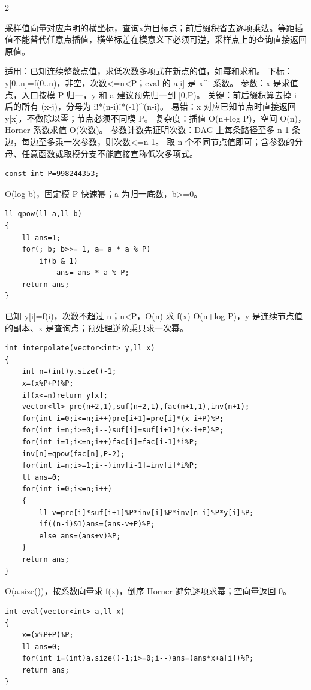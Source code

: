 \documentclass[UTF8,fontset=fandol,a4paper,twoside]{ctexart}
\newcommand{\note}[1]{{\fontsize{10}{12}\selectfont #1\par}}
\begin{document}
\begin{multicols}{2}
\note{采样值向量对应声明的横坐标，查询x为目标点；前后缀积省去逐项乘法。等距插值不能替代任意点插值，横坐标差在模意义下必须可逆，采样点上的查询直接返回原值。}
\note{适用：已知连续整数点值，求低次数多项式在新点的值，如幂和求和。 下标：y[\allowbreak{}0.\allowbreak{}.\allowbreak{}n]\allowbreak{}=\allowbreak{}f(\allowbreak{}0.\allowbreak{}.\allowbreak{}n)\allowbreak{}，非空，次数<\allowbreak{}=\allowbreak{}n<\allowbreak{}P；eval 的 a[\allowbreak{}i]\allowbreak{} 是 x\textasciicircum{}i 系数。 参数：x 是求值点，入口按模 P 归一，y 和 a 建议预先归一到 [\allowbreak{}0,\allowbreak{}P)\allowbreak{}。 关键：前后缀积算去掉 i 后的所有 (\allowbreak{}x-\allowbreak{}j)\allowbreak{}，分母为 i!*(\allowbreak{}n-\allowbreak{}i)\allowbreak{}!*(\allowbreak{}-\allowbreak{}1)\allowbreak{}\textasciicircum{}(\allowbreak{}n-\allowbreak{}i)\allowbreak{}。 易错：x 对应已知节点时直接返回 y[\allowbreak{}x]\allowbreak{}，不做除以零；节点必须不同模 P。 复杂度：插值 O(\allowbreak{}n+\allowbreak{}log P)\allowbreak{}，空间 O(\allowbreak{}n)\allowbreak{}，Horner 系数求值 O(\allowbreak{}次数)\allowbreak{}。 参数计数先证明次数：DAG 上每条路径至多 n-\allowbreak{}1 条边，每边至多乘一次参数，则次数<\allowbreak{}=\allowbreak{}n-\allowbreak{}1。 取 n 个不同节点值即可；含参数的分母、任意函数或取模分支不能直接宣称低次多项式。}
\begin{lstlisting}
const int P=998244353;
\end{lstlisting}
\note{O(\allowbreak{}log b)\allowbreak{}，固定模 P 快速幂；a 为归一底数，b>\allowbreak{}=\allowbreak{}0。}
\begin{lstlisting}
ll qpow(ll a,ll b)
{
    ll ans=1;
    for(; b; b>>= 1, a= a * a % P)
        if(b & 1)
            ans= ans * a % P;
    return ans;
}
\end{lstlisting}
\note{已知 y[\allowbreak{}i]\allowbreak{}=\allowbreak{}f(\allowbreak{}i)\allowbreak{}，次数不超过 n；n<\allowbreak{}P，O(\allowbreak{}n)\allowbreak{} 求 f(\allowbreak{}x)\allowbreak{} O(\allowbreak{}n+\allowbreak{}log P)\allowbreak{}，y 是连续节点值的副本、x 是查询点；预处理逆阶乘只求一次幂。}
\begin{lstlisting}
int interpolate(vector<int> y,ll x)
{
    int n=(int)y.size()-1;
    x=(x%P+P)%P;
    if(x<=n)return y[x];
    vector<ll> pre(n+2,1),suf(n+2,1),fac(n+1,1),inv(n+1);
    for(int i=0;i<=n;i++)pre[i+1]=pre[i]*(x-i+P)%P;
    for(int i=n;i>=0;i--)suf[i]=suf[i+1]*(x-i+P)%P;
    for(int i=1;i<=n;i++)fac[i]=fac[i-1]*i%P;
    inv[n]=qpow(fac[n],P-2);
    for(int i=n;i>=1;i--)inv[i-1]=inv[i]*i%P;
    ll ans=0;
    for(int i=0;i<=n;i++)
    {
        ll v=pre[i]*suf[i+1]%P*inv[i]%P*inv[n-i]%P*y[i]%P;
        if((n-i)&1)ans=(ans-v+P)%P;
        else ans=(ans+v)%P;
    }
    return ans;
}
\end{lstlisting}
\note{O(\allowbreak{}a.\allowbreak{}size(\allowbreak{})\allowbreak{})\allowbreak{}，按系数向量求 f(\allowbreak{}x)\allowbreak{}，倒序 Horner 避免逐项求幂；空向量返回 0。}
\begin{lstlisting}
int eval(vector<int> a,ll x)
{
    x=(x%P+P)%P;
    ll ans=0;
    for(int i=(int)a.size()-1;i>=0;i--)ans=(ans*x+a[i])%P;
    return ans;
}
\end{lstlisting}

\end{multicols}
\end{document}
